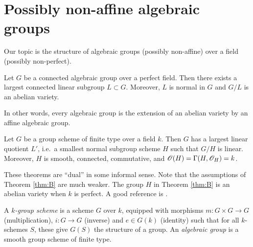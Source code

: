 
%
%
%
%
%



\section{Possibly non-affine algebraic groups}



Our topic is the structure of algebraic groups (possibly non-affine) over 
a field (possibly non-perfect). 

\begin{theo}\label{thm:A}
Let $G$ be a connected algebraic group over a perfect field. Then there exists 
a largest connected linear subgroup $L\subset G$. Moreover, $L$ is normal 
in $G$ and $G/L$ is an abelian variety. 
\end{theo}

In other words, every algebraic group is the extension of an abelian variety by 
an affine algebraic group. 

\begin{theo}\label{thm:B}
Let $G$ be a group scheme of finite type over a field $k$. Then $G$ has a 
largest linear quotient $L'$, i.e.~a smallest normal subgroup scheme $H$ such 
that $G/H$ is linear. Moreover, $H$ is smooth, connected, commutative, and 
$\mathscr{O}(H) = \Gamma(H,\mathscr{O}_H) = k$. 
\end{theo}

These theorems are ``dual'' in some informal sense. Note that the assumptions 
of Theorem \ref{thm:B} are much weaker. The group $H$ in Theorem \ref{thm:B} 
is an abelian variety when $k$ is perfect. 
A good reference is \cite{m14}. 

\begin{defi}
A \emph{$k$-group scheme} is a scheme $G$ over $k$, equipped with morphisms 
$m:G\times G\to G$ (multiplication), $i:G\to G$ (inverse) and 
$e\in G(k)$ (identity) such that for all $k$-schemes $S$, these give 
$G(S)$ the structure of a group. An \emph{algebraic group} is a smooth group 
scheme of finite type. 
\end{defi}

